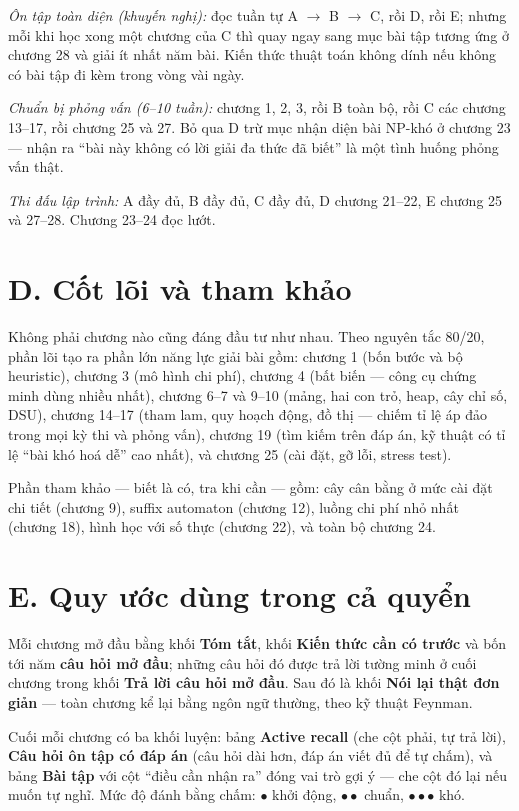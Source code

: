 \documentclass[algorithm.tex]{subfiles}
\begin{document}
\emph{Ôn tập toàn diện (khuyến nghị):} đọc tuần tự A \(\rightarrow\) B \(\rightarrow\) C, rồi D, rồi E; nhưng mỗi khi học xong một chương của C thì quay ngay sang mục bài tập tương ứng ở chương 28 và giải ít nhất năm bài. Kiến thức thuật toán không dính nếu không có bài tập đi kèm trong vòng vài ngày.

\emph{Chuẩn bị phỏng vấn (6--10 tuần):} chương 1, 2, 3, rồi B toàn bộ, rồi C các chương 13--17, rồi chương 25 và 27. Bỏ qua D trừ mục nhận diện bài NP-khó ở chương 23 --- nhận ra ``bài này không có lời giải đa thức đã biết'' là một tình huống phỏng vấn thật.

\emph{Thi đấu lập trình:} A đầy đủ, B đầy đủ, C đầy đủ, D chương 21--22, E chương 25 và 27--28. Chương 23--24 đọc lướt.

\section*{D. Cốt lõi và tham khảo}

Không phải chương nào cũng đáng đầu tư như nhau. Theo nguyên tắc 80/20, phần lõi tạo ra phần lớn năng lực giải bài gồm: chương 1 (bốn bước và bộ heuristic), chương 3 (mô hình chi phí), chương 4 (bất biến --- công cụ chứng minh dùng nhiều nhất), chương 6--7 và 9--10 (mảng, hai con trỏ, heap, cây chỉ số, DSU), chương 14--17 (tham lam, quy hoạch động, đồ thị --- chiếm tỉ lệ áp đảo trong mọi kỳ thi và phỏng vấn), chương 19 (tìm kiếm trên đáp án, kỹ thuật có tỉ lệ ``bài khó hoá dễ'' cao nhất), và chương 25 (cài đặt, gỡ lỗi, stress test).

Phần tham khảo --- biết là có, tra khi cần --- gồm: cây cân bằng ở mức cài đặt chi tiết (chương 9), suffix automaton (chương 12), luồng chi phí nhỏ nhất (chương 18), hình học với số thực (chương 22), và toàn bộ chương 24.

\section*{E. Quy ước dùng trong cả quyển}

Mỗi chương mở đầu bằng khối \textbf{Tóm tắt}, khối \textbf{Kiến thức cần có trước} và bốn tới năm \textbf{câu hỏi mở đầu}; những câu hỏi đó được trả lời tường minh ở cuối chương trong khối \textbf{Trả lời câu hỏi mở đầu}. Sau đó là khối \textbf{Nói lại thật đơn giản} --- toàn chương kể lại bằng ngôn ngữ thường, theo kỹ thuật Feynman.

Cuối mỗi chương có ba khối luyện: bảng \textbf{Active recall} (che cột phải, tự trả lời), \textbf{Câu hỏi ôn tập có đáp án} (câu hỏi dài hơn, đáp án viết đủ để tự chấm), và bảng \textbf{Bài tập} với cột ``điều cần nhận ra'' đóng vai trò gợi ý --- che cột đó lại nếu muốn tự nghĩ. Mức độ đánh bằng chấm: \(\bullet\) khởi động, \(\bullet\bullet\) chuẩn, \(\bullet\bullet\bullet\) khó.
\end{document}
